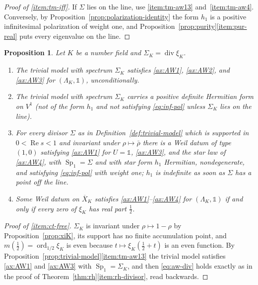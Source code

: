 \documentclass[11pt]{amsart}
\theoremstyle{plain}
\newtheorem{proposition}[theorem]{Proposition}
\theoremstyle{definition}
\theoremstyle{remark}
\numberwithin{equation}{section}
\newcommand{\Xbar}{\overline{X}}
\DeclareMathOperator{\divisor}{div}
\DeclareMathOperator{\Rea}{Re}
\DeclareMathOperator{\ord}{ord}
\renewcommand{\Re}{\Rea}
\begin{document}
\begin{proof}[Proof of \ref{item:tm-iff}]
If $\Sigma$ lies on the line, use \ref{item:tm-aw13}
and~\ref{item:tm-aw4}. Conversely, by
Proposition~\ref{prop:polarization-identity} the form $h_1$ is a
positive infinitesimal polarization of weight one, and
Proposition~\ref{prop:purity}\ref{item:pur-real} puts every eigenvalue
on the line.
\end{proof}

\begin{proposition}\label{prop:content}
Let $K$ be a number field and $\Sigma_K=\divisor\xi_K$.
\begin{enumerate}[label=(\roman*)]
\item\label{item:ct-free} The trivial model with spectrum $\Sigma_K$
  satisfies \ref{ax:AW1}, \ref{ax:AW2}, and \ref{ax:AW3} for
  $(\Lambda_K,\mathbb 1)$, unconditionally.
\item\label{item:ct-pos} The trivial model with spectrum $\Sigma_K$
  carries a positive definite Hermitian form on $V^1$ (not of the form
  $h_1$ and not satisfying \eqref{eq:inf-pol} unless $\Sigma_K$ lies on
  the line).
\item\label{item:ct-indef} For every divisor $\Sigma$ as in
  Definition~\ref{def:trivial-model} which is supported in
  $0<\Re s<1$ and invariant under $\rho\mapsto\bar\rho$ there is a Weil
  datum of type $(1,0)$ satisfying \ref{ax:AW1} for $U=\mathbb 1$,
  \ref{ax:AW3}, and the star law of \ref{ax:AW4}, with
  $\operatorname{Sp}_1=\Sigma$ and with star form $h_1$ Hermitian,
  nondegenerate, and satisfying \eqref{eq:inf-pol} with weight one;
  $h_1$ is indefinite as soon as $\Sigma$ has a point off the line.
\item\label{item:ct-iff} Some Weil datum on $\Xbar_K$ satisfies
  \ref{ax:AW1}--\ref{ax:AW4} for $(\Lambda_K,\mathbb 1)$ if and only if
  every zero of $\xi_K$ has real part $\tfrac12$.
\end{enumerate}
\end{proposition}

\begin{proof}[Proof of \ref{item:ct-free}]
$\Sigma_K$ is invariant under $\rho\mapsto1-\rho$ by
Proposition~\ref{prop:xiK}, its support has no finite accumulation
point, and $m(\tfrac12)=\ord_{1/2}\xi_K$ is even because
$t\mapsto\xi_K(\tfrac12+t)$ is an even function. By
Proposition~\ref{prop:trivial-model}\ref{item:tm-aw13} the trivial
model satisfies \ref{ax:AW1} and \ref{ax:AW3} with
$\operatorname{Sp}_1=\Sigma_K$, and then \eqref{eq:aw-div} holds exactly
as in the proof of Theorem~\ref{thm:rh}\ref{item:rh-divisor}, read
backwards.
\end{proof}
\end{document}
